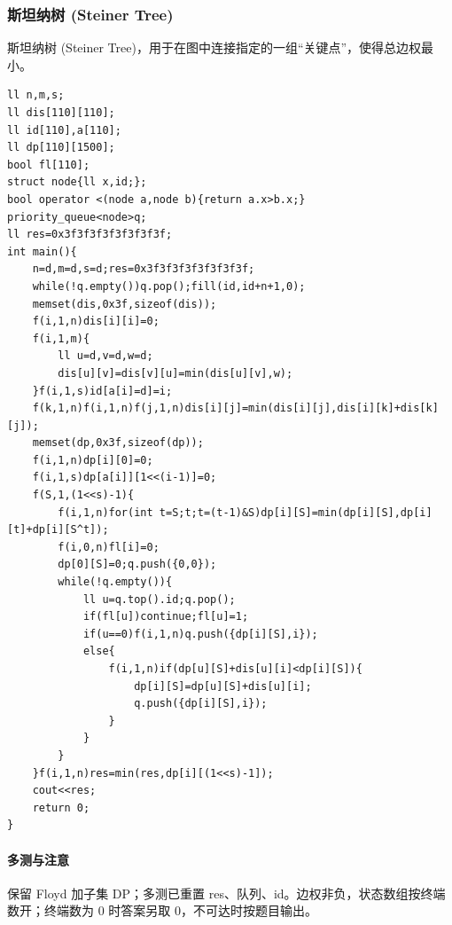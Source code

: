 \subsubsection{斯坦纳树 (Steiner Tree)}
斯坦纳树 (Steiner Tree)，用于在图中连接指定的一组“关键点”，使得总边权最小。
\begin{lstlisting}
ll n,m,s;
ll dis[110][110];
ll id[110],a[110];
ll dp[110][1500];
bool fl[110];
struct node{ll x,id;};
bool operator <(node a,node b){return a.x>b.x;}
priority_queue<node>q;
ll res=0x3f3f3f3f3f3f3f3f;
int main(){
	n=d,m=d,s=d;res=0x3f3f3f3f3f3f3f3f;
    while(!q.empty())q.pop();fill(id,id+n+1,0);
	memset(dis,0x3f,sizeof(dis));
    f(i,1,n)dis[i][i]=0;
	f(i,1,m){
		ll u=d,v=d,w=d;
		dis[u][v]=dis[v][u]=min(dis[u][v],w);
	}f(i,1,s)id[a[i]=d]=i;
	f(k,1,n)f(i,1,n)f(j,1,n)dis[i][j]=min(dis[i][j],dis[i][k]+dis[k][j]);
	memset(dp,0x3f,sizeof(dp));
	f(i,1,n)dp[i][0]=0;
	f(i,1,s)dp[a[i]][1<<(i-1)]=0;
	f(S,1,(1<<s)-1){
		f(i,1,n)for(int t=S;t;t=(t-1)&S)dp[i][S]=min(dp[i][S],dp[i][t]+dp[i][S^t]);
		f(i,0,n)fl[i]=0;
		dp[0][S]=0;q.push({0,0});
		while(!q.empty()){
			ll u=q.top().id;q.pop();
			if(fl[u])continue;fl[u]=1;
			if(u==0)f(i,1,n)q.push({dp[i][S],i});
			else{
				f(i,1,n)if(dp[u][S]+dis[u][i]<dp[i][S]){
					dp[i][S]=dp[u][S]+dis[u][i];
					q.push({dp[i][S],i});
				}
			}
		}
	}f(i,1,n)res=min(res,dp[i][(1<<s)-1]);
	cout<<res;
	return 0;
}
\end{lstlisting}

\paragraph{多测与注意} 保留 Floyd 加子集 DP；多测已重置 res、队列、id。边权非负，状态数组按终端数开；终端数为 0 时答案另取 0，不可达时按题目输出。
